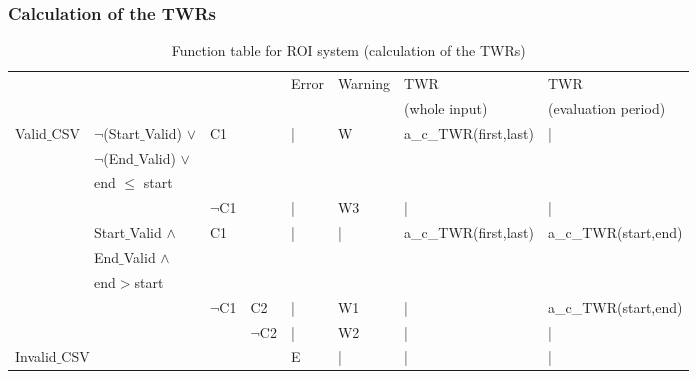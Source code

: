 \documentclass[runningheads,12pt]{article}
\begin{document}
\begin{landscape}
\subsubsection{Calculation of the TWRs}

\begin{table}[H]
{
\centering
\begin{tabular}{|l|l|l|l||l|l|l|l|}
\hline
\multicolumn{4}{|c||}{} & Error & Warning &TWR & TWR\\ 
\multicolumn{4}{|l||}{}&&& (whole input) & (evaluation period)\\

\hline
Valid$\_$CSV & $\lnot$(Start$\_$Valid) $\vee$ & \multicolumn{2}{|l||}{C1} & | & W & a\_c\_TWR(first,last) & |\\ 
& $\lnot$(End$\_$Valid) $\vee$& \multicolumn{2}{|l||}{} &&& &\\
& end $\le$ start & \multicolumn{2}{|l||}{} &&& &\\

\cline{3-8}
& & \multicolumn{2}{|l||}{$\lnot$C1} & | & W3 & | & |\\ 


\cline{2-8}
& Start$\_$Valid  $\wedge$  & \multicolumn{2}{|l||}{C1} & | & | & a\_c\_TWR(first,last) & a\_c\_TWR(start,end)\\ 
& End$\_$Valid $\wedge$  & \multicolumn{2}{|l||}{} &&&&\\
& end$>$start   & \multicolumn{2}{|l||}{}&&&&\\

\cline{3-8}
&& $\lnot$C1 & C2 & | & W1 & | & a\_c\_TWR(start,end)\\

\cline{4-8}
&& & $\lnot$C2 & | & W2 & | & |\\

\hline
\multicolumn{4}{|l||}{Invalid$\_$CSV} & E & | & | & |\\ 

\hline
\end{tabular}

\caption{Function table for ROI system (calculation of the TWRs)}
\label{table:ftable_TWR}
}
\end{table}
\end{landscape}


\end{document}
